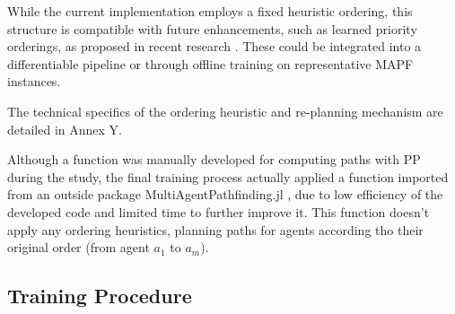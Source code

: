 While the current implementation employs a fixed heuristic ordering, this structure is compatible with future enhancements, such as learned priority orderings, as proposed in recent research \cite{zhangLearningPriorityOrdering2022}. These could be integrated into a differentiable pipeline or through offline training on representative MAPF instances.

The technical specifics of the ordering heuristic and re-planning mechanism are detailed in Annex Y.

Although a function was manually developed for computing paths with PP during the study, the final training process actually applied a function imported from an outside package MultiAgentPathfinding.jl \cite{dalleLearningCombinatorialOptimization2022}, due to low efficiency of the developed code and limited time to further improve it. This function doesn't apply any ordering heuristics, planning paths for agents according tho their original order (from agent $a_1$ to $a_m$).

\subsection{Training Procedure}

